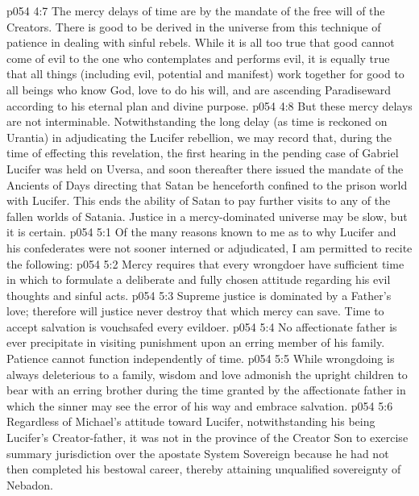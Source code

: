 \vs p054 4:7 The mercy delays of time are by the mandate of the free will of the Creators. There is good to be derived in the universe from this technique of patience in dealing with sinful rebels. While it is all too true that good cannot come of evil to the one who contemplates and performs evil, it is equally true that all things (including evil, potential and manifest) work together for good to all beings who know God, love to do his will, and are ascending Paradiseward according to his eternal plan and divine purpose.
\vs p054 4:8 But these mercy delays are not interminable. Notwithstanding the long delay (as time is reckoned on Urantia) in adjudicating the Lucifer rebellion, we may record that, during the time of effecting this revelation, the first hearing in the pending case of Gabriel  Lucifer was held on Uversa, and soon thereafter there issued the mandate of the Ancients of Days directing that Satan be henceforth confined to the prison world with Lucifer. This ends the ability of Satan to pay further visits to any of the fallen worlds of Satania. Justice in a mercy\hyp{}dominated universe may be slow, but it is certain.
\vs p054 5:1 Of the many reasons known to me as to why Lucifer and his confederates were not sooner interned or adjudicated, I am permitted to recite the following:
\vs p054 5:2 \bibnobreakspace Mercy requires that every wrongdoer have sufficient time in which to formulate a deliberate and fully chosen attitude regarding his evil thoughts and sinful acts.
\vs p054 5:3 \pc {}\bibnobreakspace Supreme justice is dominated by a Father’s love; therefore will justice never destroy that which mercy can save. Time to accept salvation is vouchsafed every evildoer.
\vs p054 5:4 \pc {}\bibnobreakspace No affectionate father is ever precipitate in visiting punishment upon an erring member of his family. Patience cannot function independently of time.
\vs p054 5:5 \pc {}\bibnobreakspace While wrongdoing is always deleterious to a family, wisdom and love admonish the upright children to bear with an erring brother during the time granted by the affectionate father in which the sinner may see the error of his way and embrace salvation.
\vs p054 5:6 \pc {}\bibnobreakspace Regardless of Michael’s attitude toward Lucifer, notwithstanding his being Lucifer’s Creator\hyp{}father, it was not in the province of the Creator Son to exercise summary jurisdiction over the apostate System Sovereign because he had not then completed his bestowal career, thereby attaining unqualified sovereignty of Nebadon.
